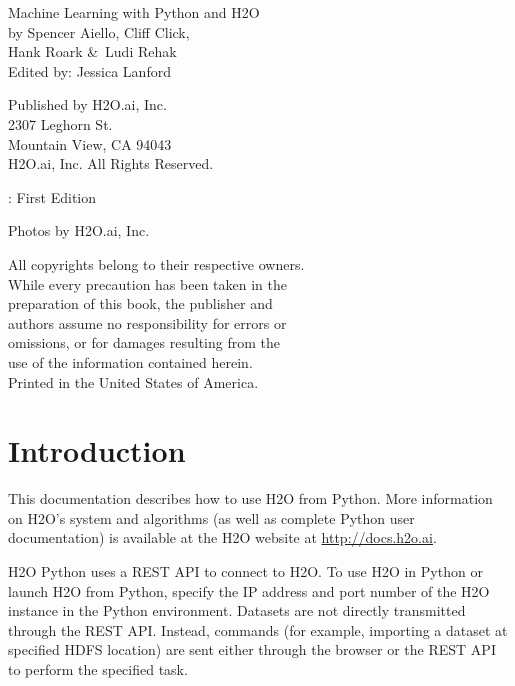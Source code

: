 \newpage
\restoregeometry

\null\vfill %

\thispagestyle{empty}%

{\raggedright 

Machine Learning with Python and H2O\\
  by Spencer Aiello, Cliff Click, \\ Hank Roark \&\  Ludi Rehak\\
Edited by: Jessica Lanford
\bigskip

Published by H2O.ai, Inc. \\
2307 Leghorn St. \\
Mountain View, CA 94043\\
\bigskip
\textcopyright \the\year \hspace{1pt} H2O.ai, Inc. All Rights Reserved. 
\bigskip

\monthname \hspace{1pt}  \the\year: First Edition 
\bigskip

Photos by \textcopyright H2O.ai, Inc.
\bigskip

All copyrights belong to their respective owners.\\
While every precaution has been taken in the\\
preparation of this book, the publisher and\\
authors assume no responsibility for errors or\\
omissions, or for damages resulting from the\\
use of the information contained herein.\\
\bigskip
Printed in the United States of America. 
}


\newpage
\thispagestyle{empty}%

\tableofcontents
\thispagestyle{empty}%

\newpage

\section{Introduction}

This documentation describes how to use H2O from Python. More information on H2O's system and algorithms
(as well as complete Python user documentation) is available at the H2O website at {\url{http://docs.h2o.ai}}.

H2O Python uses a REST API to connect to H2O. To use H2O in Python or launch H2O from Python, specify the IP address and port number of the H2O instance in the Python environment. Datasets are not directly transmitted
through the REST API. Instead, commands (for example, importing a dataset at specified HDFS location) are sent either through the browser or the REST API to perform the specified task.

